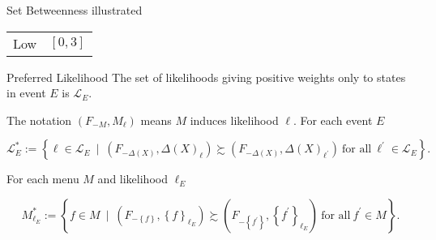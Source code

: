 \documentclass[usenames,dvipsnames,aspectratio=169,11pt, envcountsect, handout]{beamer}
\begin{document}
\begin{frame}{Set Betweenness illustrated}
\begin{table}[H]
\begin{minipage}{0.45\textwidth}
\begin{tabular}{c | c}
				Low                            & \( \left[0,3 \right] \)                                                                         \\
			\end{tabular}
		\end{minipage}
	\end{table}
\end{frame}

\begin{frame}{Preferred Likelihood}
	The set of likelihoods giving positive weights only to states in event \( E \) is \( \mathcal{L}_E \).

	\vfill

	The notation \( \left( F_{-M}, M_{\ell} \right) \) means \( M \) induces likelihood \( \ell \). For each event \( E \)

	\vfill

	\[
		\mathcal{L}_{E}^{*} := \left\{ \ell \in \mathcal{L}_{E} \: \mid \: \left( F_{-\Delta \left(X \right)}, \Delta \left(X \right)_{\ell} \right) \succsim \left( F_{-\Delta \left(X \right)}, \Delta \left(X \right)_{\ell^{\prime}} \right) \: \text{for all} \: \ell^{\prime} \in \mathcal{L}_E \right\} .
	\] \pause

	\vfill

	For each menu \( M \) and likelihood \( \ell_{E} \)

	\vfill

	\[
		M^{*}_{\ell_{E}} := \left\{ f \in M \: \mid \: \left( F_{-\left\{ f \right\}}, \left\{ f \right\}_{\ell_{E}} \right) \succsim \left( F_{-\left\{ f^{\prime} \right\}}, \left\{ f^{\prime} \right\}_{\ell_{E}} \right) \: \text{for all} \: f^{\prime} \in M \right\} .
	\]
\end{frame}
\end{document}
